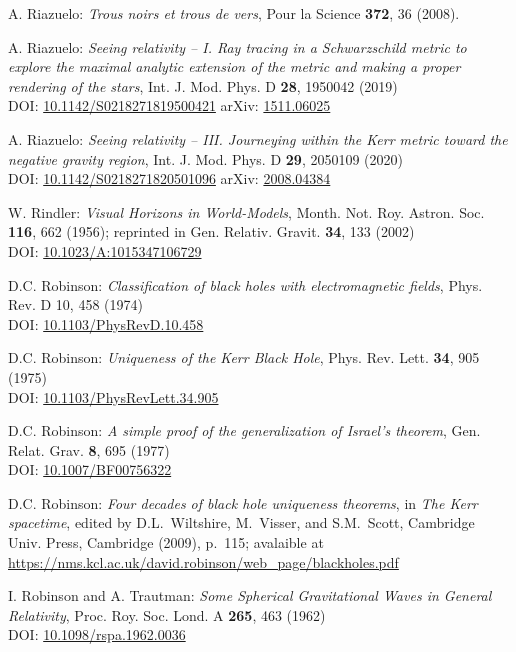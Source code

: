 \begin{thebibliography}{123}
A. Riazuelo:
{\em Trous noirs et trous de vers},
Pour la Science {\bf 372}, 36 (2008).

A. Riazuelo:
{\em Seeing relativity -- I. Ray tracing in a Schwarzschild metric to explore the maximal analytic extension of the metric and making a proper rendering of the stars},
Int. J. Mod. Phys. D {\bf 28}, 1950042 (2019)\\
DOI: \href{https://doi.org/10.1142/S0218271819500421}{10.1142/S0218271819500421}
\hfill
arXiv: \href{https://arxiv.org/abs/1511.06025}{1511.06025}

A. Riazuelo:
{\em Seeing relativity -- III. Journeying within the Kerr metric toward the negative gravity region},
Int. J. Mod. Phys. D {\bf 29}, 2050109 (2020)\\
DOI: \href{https://doi.org/10.1142/S0218271820501096}{10.1142/S0218271820501096}\hfill
arXiv: \href{https://arxiv.org/abs/2008.04384}{2008.04384}

W. Rindler: {\em Visual Horizons in World-Models},
Month. Not. Roy. Astron. Soc. {\bf 116}, 662 (1956);
reprinted in Gen. Relativ. Gravit. {\bf 34}, 133 (2002)\\
DOI: \href{https://doi.org/10.1023/A:1015347106729}{10.1023/A:1015347106729}

D.C. Robinson:
{\em Classification of black holes with electromagnetic fields},
Phys. Rev. D 10, 458 (1974)\\
DOI: \href{https://doi.org/10.1103/PhysRevD.10.458}{10.1103/PhysRevD.10.458}

D.C. Robinson:
{\em Uniqueness of the Kerr Black Hole},
Phys. Rev. Lett. {\bf 34}, 905 (1975)\\
DOI: \href{https://doi.org/10.1103/PhysRevLett.34.905}{10.1103/PhysRevLett.34.905}

D.C. Robinson:
{\em A simple proof of the generalization of Israel's theorem},
Gen. Relat. Grav. {\bf 8}, 695 (1977)\\
DOI: \href{https://doi.org/10.1007/BF00756322}{10.1007/BF00756322}

D.C. Robinson:
{\em Four decades of black hole uniqueness theorems},
in {\em The Kerr spacetime}, edited by D.L.~Wiltshire, M.~Visser, and S.M.~Scott,
Cambridge Univ. Press, Cambridge (2009), p.~115; avalaible at\\
\url{https://nms.kcl.ac.uk/david.robinson/web_page/blackholes.pdf}

I. Robinson and A. Trautman:
{\em Some Spherical Gravitational Waves in General Relativity},
Proc. Roy. Soc. Lond. A {\bf 265}, 463 (1962)\\
DOI: \href{https://doi.org/10.1098/rspa.1962.0036}{10.1098/rspa.1962.0036}


\end{thebibliography}
